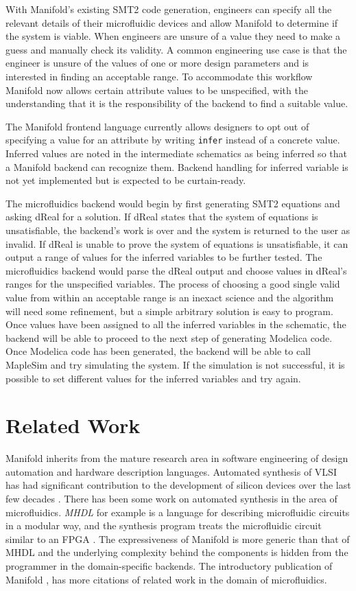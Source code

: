With Manifold's existing SMT2 code generation, engineers can specify all the
relevant details of their microfluidic devices and allow Manifold to determine if the system is viable. When engineers
are unsure of a value they need to make a guess and manually check its
validity. A common engineering use case is that the engineer is unsure of the
values of one or more design parameters and is interested in finding an
acceptable range. To accommodate this workflow Manifold now allows certain
attribute values to be unspecified, with the understanding that it is the
responsibility of the backend to find a suitable value.

The Manifold frontend language currently allows designers to opt out of
specifying a value for an attribute by writing {\tt infer} instead of a
concrete value. Inferred values are noted in the intermediate schematics as
being inferred so that a Manifold backend can recognize them. Backend handling
for inferred variable is not yet implemented but is expected to be curtain-ready.

The microfluidics backend would begin by first generating SMT2 equations and asking dReal for a solution.
If dReal states that the system of equations is unsatisfiable, the backend's work is over and the system is returned to the user as invalid.
If dReal is unable to prove the system of equations is unsatisfiable, it can output a range of values for the inferred variables to be further tested.
The microfluidics backend would parse the dReal output and choose values in dReal's ranges for the unspecified variables.
The process of choosing a good single valid value from within an acceptable range is an inexact science and the algorithm will need some refinement, but a simple arbitrary solution is easy to program.
Once values have been assigned to all the inferred variables in the schematic, the backend will be able to proceed to the next step of generating Modelica code.
Once Modelica code has been generated, the backend will be able to call MapleSim and try simulating the system.
If the simulation is not successful, it is possible to set different values for the inferred variables and try again.

\section{Related Work}

Manifold inherits from the mature research area in software engineering of design automation and hardware description languages.
Automated synthesis of VLSI has had significant contribution to the development of silicon devices over the last few decades \cite{MeadConway80}.
There has been some work on automated synthesis in the area of microfluidics.
\emph{MHDL} for example is a language for describing microfluidic circuits in a modular way, and the synthesis program treats the microfluidic circuit similar to an FPGA \cite{McDaniel13aspdac}.
The expressiveness of Manifold is more generic than that of MHDL and the underlying complexity behind the components is hidden from the programmer in the domain-specific backends.
The introductory publication of Manifold \cite{Berzish16cascon}, has more citations of related work in the domain of microfluidics.

